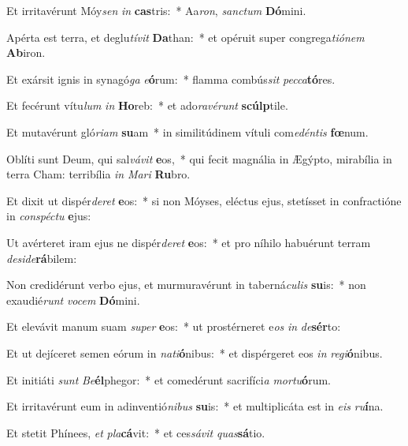 \item Et irritavérunt Móy\textit{sen} \textit{in} \textbf{cas}tris:~* Aa\textit{ron}, \textit{sanc}\textit{tum} \textbf{Dó}mini.
\item Apérta est terra, et deglu\textit{tí}\textit{vit} \textbf{Da}than:~* et opéruit super congrega\textit{ti}\textit{ó}\textit{nem} \textbf{Ab}iron.
\item Et exársit ignis in synagó\textit{ga} \textit{e}\textbf{ó}rum:~* flamma combús\textit{sit} \textit{pec}\textit{ca}\textbf{tó}res.
\item Et fecérunt vítu\textit{lum} \textit{in} \textbf{Ho}reb:~* et ado\textit{ra}\textit{vé}\textit{runt} \textbf{scúlp}tile.
\item Et mutavérunt gló\textit{ri}\textit{am} \textbf{su}am~* in similitúdinem vítuli com\textit{e}\textit{dén}\textit{tis} \textbf{fœ}num.
\item Oblíti sunt Deum, qui sal\textit{vá}\textit{vit} \textbf{e}os,~* qui fecit magnália in Ægýpto, mirabília in terra Cham: terribília \textit{in} \textit{Ma}\textit{ri} \textbf{Ru}bro.
\item Et dixit ut dispér\textit{de}\textit{ret} \textbf{e}os:~* si non Móyses, eléctus ejus, stetísset in confractióne in \textit{con}\textit{spéc}\textit{tu} \textbf{e}jus:
\item Ut avérteret iram ejus ne dispér\textit{de}\textit{ret} \textbf{e}os:~* et pro níhilo habuérunt terram \textit{de}\textit{si}\textit{de}\textbf{rá}bilem:
\item Non credidérunt verbo ejus, et murmuravérunt in taberná\textit{cu}\textit{lis} \textbf{su}is:~* non exaudié\textit{runt} \textit{vo}\textit{cem} \textbf{Dó}mini.
\item Et elevávit manum suam \textit{su}\textit{per} \textbf{e}os:~* ut prostérneret e\textit{os} \textit{in} \textit{de}\textbf{sér}to:
\item Et ut dejíceret semen eórum in \textit{na}\textit{ti}\textbf{ó}nibus:~* et dispérgeret eos \textit{in} \textit{re}\textit{gi}\textbf{ó}nibus.
\item Et initiáti \textit{sunt} \textit{Be}\textbf{él}phegor:~* et comedérunt sacrifíci\textit{a} \textit{mor}\textit{tu}\textbf{ó}rum.
\item Et irritavérunt eum in adinventió\textit{ni}\textit{bus} \textbf{su}is:~* et multiplicáta est in \textit{e}\textit{is} \textit{ru}\textbf{í}na.
\item Et stetit Phínees, \textit{et} \textit{pla}\textbf{cá}vit:~* et ces\textit{sá}\textit{vit} \textit{quas}\textbf{sá}tio.
